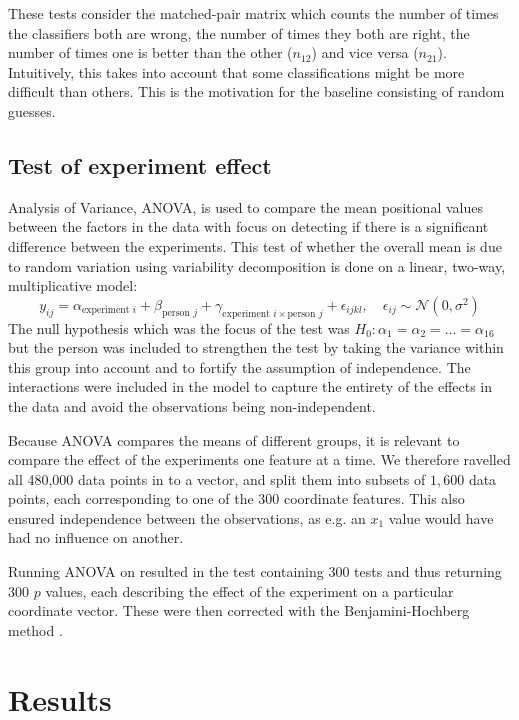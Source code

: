\documentclass[11pt,fleqn]{article}
\begin{document}
These tests consider the matched-pair matrix which counts the number of times the classifiers both are wrong, the number of times they both are right, the number of times one is better than the other (\(n_{12}\)) and vice versa (\(n_{21}\)).
Intuitively, this takes into account that some classifications might be more difficult than others. 
This is the motivation for the baseline consisting of random guesses.


\subsection{Test of experiment effect}\label{subsec:expeffect}
Analysis of Variance, ANOVA, is used to compare the mean positional values between the factors in the data with focus on detecting if there is a significant difference between the experiments.
This test of whether the overall mean is due to random variation using variability decomposition is done on a linear, two-way, multiplicative model:
\[
	y_{ij} = \alpha_{\text{experiment } i}+
	\beta_{\text{person } j}+ 
	\gamma_{\text{experiment } i \times\text{person } j }
	+ \epsilon_{ijkl}, \quad \epsilon_{ij} \sim \mathcal N (0, \sigma^2)
\]
The null hypothesis which was the focus of the test was $ H_0: \alpha_1=\alpha_2=\ldots=\alpha_{16} $ but the person was included to strengthen the test by taking the variance within this group into account and to fortify the assumption of independence. 
The interactions were included in the model to capture the entirety of the effects in the data and avoid the observations being non-independent.

Because ANOVA compares the means of different groups, it is relevant to compare the effect of the experiments one feature at a time.
We therefore ravelled all 480,000 data points in to a vector, and split them into subsets of $ 1,600 $ data points, each corresponding to one of the $ 300 $ coordinate features.
This also ensured independence between the observations, as e.g. an $ x_1 $ value would have had no influence on another.

Running ANOVA on resulted in the test containing 300 tests and thus returning 300 $ p $ values, each describing the effect of the experiment on a particular coordinate vector. These were then corrected with the Benjamini-Hochberg method \cite{BH}.


\section{Results}
\end{document}
